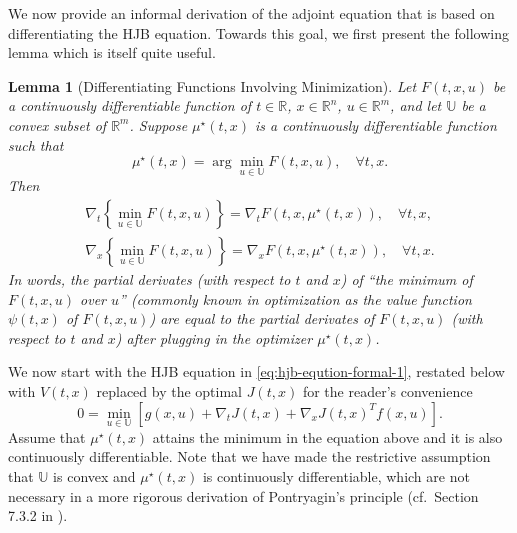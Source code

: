 \documentclass[
]{book}
\newtheorem{lemma}{Lemma}[chapter]
\theoremstyle{definition}
\theoremstyle{definition}
\theoremstyle{definition}
\theoremstyle{definition}
\theoremstyle{remark}
\begin{document}
We now provide an informal derivation of the adjoint equation that is based on differentiating the HJB equation. Towards this goal, we first present the following lemma which is itself quite useful.

\begin{lemma}[Differentiating Functions Involving Minimization]
\protect\hypertarget{lem:gradientofminimumfunctions}{}\label{lem:gradientofminimumfunctions}Let \(F(t,x,u)\) be a continuously differentiable function of \(t \in \mathbb{R}\), \(x \in \mathbb{R}^n\), \(u \in \mathbb{R}^m\), and let \(\mathbb{U}\) be a convex subset of \(\mathbb{R}^m\). Suppose \(\mu^\star(t,x)\) is a continuously differentiable function such that
\[
\mu^\star(t,x) = \arg\min_{u \in \mathbb{U}} F(t,x,u), \quad \forall t,x.
\]
Then
\begin{align}
\nabla_t \left\{ \min_{u \in \mathbb{U}} F(t,x,u) \right\} = \nabla_t F(t,x,\mu^\star(t,x)), \quad \forall t,x, \\
\nabla_x \left\{ \min_{u \in \mathbb{U}} F(t,x,u) \right\} = \nabla_x F(t,x,\mu^\star(t,x)), \quad \forall t,x.
\end{align}
In words, the partial derivates (with respect to \(t\) and \(x\)) of ``the minimum of \(F(t,x,u)\) over \(u\)'' (commonly known in optimization as the value function \(\psi(t,x)\) of \(F(t,x,u)\)) are equal to the partial derivates of \(F(t,x,u)\) (with respect to \(t\) and \(x\)) after plugging in the optimizer \(\mu^\star(t,x)\).
\end{lemma}

We now start with the HJB equation in \eqref{eq:hjb-eqution-formal-1}, restated below with \(V(t,x)\) replaced by the optimal \(J(t,x)\) for the reader's convenience
\begin{equation}
0 = \min_{u \in \mathbb{U}} \left[ g(x,u) + \nabla_t J(t,x) + \nabla_x J(t,x)^Tf(x,u)  \right].
\label{eq:hjb-equation-restate-for-pmp}
\end{equation}
Assume that \(\mu^\star(t,x)\) attains the minimum in the equation above and it is also continuously differentiable. Note that we have made the restrictive assumption that \(\mathbb{U}\) is convex and \(\mu^\star(t,x)\) is continuously differentiable, which are not necessary in a more rigorous derivation of Pontryagin's principle (cf.~Section 7.3.2 in \citep{bertsekas12book-dpocI}).
\end{document}
